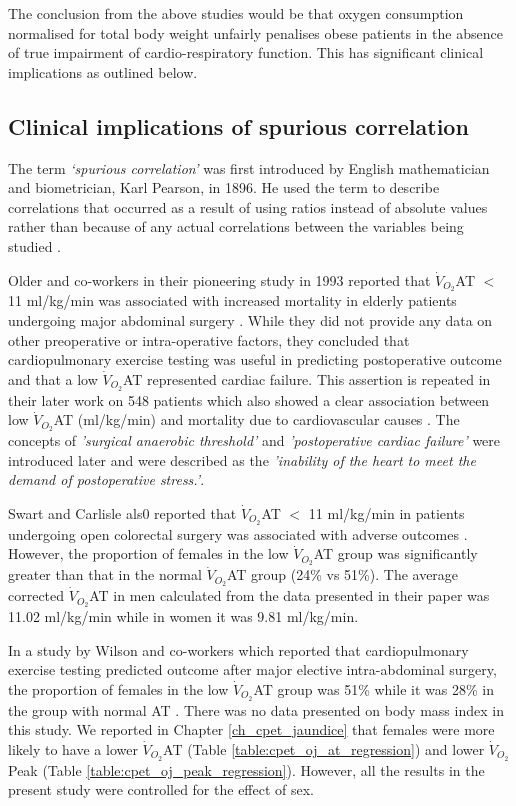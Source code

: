 The conclusion from the above studies would be that oxygen consumption normalised for total body weight unfairly penalises obese patients in the absence of true impairment of cardio-respiratory function. 
This has significant clinical implications as outlined below.

\subsection{Clinical implications of spurious correlation}

The term \textit{`spurious correlation'} was first introduced by English mathematician and biometrician, Karl Pearson, in 1896. 
He used the term to describe correlations that occurred as a result of using ratios instead of absolute values rather than because of any actual correlations between the variables being studied \parencite{pearson_mathematical_1896}.

Older and co-workers in their pioneering study in 1993 reported that $\dot{V}_{O_2}$AT $<$ 11 ml/kg/min was associated with increased mortality in elderly patients undergoing major abdominal surgery \parencite{older_preoperative_1993}. 
While they did not provide any data on other preoperative or intra-operative factors, they concluded that cardiopulmonary exercise testing was useful in predicting postoperative outcome and that a low $\dot{V}_{O_2}$AT represented cardiac failure. 
This assertion is repeated in their later work on 548 patients which also showed a clear association between low $\dot{V}_{O_2}$AT (ml/kg/min) and mortality due to cardiovascular causes \parencite{older_cardiopulmonary_1999}. 
The concepts of \textit{'surgical anaerobic threshold'} and \textit{'postoperative cardiac failure'} were introduced later and were described as the \textit{'inability of the heart to meet the demand of postoperative stress.'}\parencite{_ats/accp_2003}.

Swart and Carlisle als0 reported that $\dot{V}_{O_2}$AT $<$ 11 ml/kg/min in patients undergoing open colorectal surgery was associated with adverse outcomes \parencite{swart_case-controlled_2012}. 
However, the proportion of females in the low $\dot{V}_{O_2}$AT group was significantly greater than that in the normal $\dot{V}_{O_2}$AT group (24\% vs 51\%). 
The average corrected $\dot{V}_{O_2}$AT in men calculated from the data presented in their paper was 11.02 ml/kg/min while in women it was 9.81 ml/kg/min. 

In a study by Wilson and co-workers which reported that cardiopulmonary exercise testing predicted outcome after major elective intra-abdominal surgery, the proportion of females in the low $\dot{V}_{O_2}$AT group was 51\% while it was 28\% in the group with normal AT \parencite{wilson_impaired_2010}. 
There was no data presented on body mass index in this study. 
We reported in Chapter \ref{ch_cpet_jaundice} that females were more likely to have a lower $\dot{V}_{O_2}$AT (Table \ref{table:cpet_oj_at_regression}) and lower $\dot{V}_{O_2}$Peak (Table \ref{table:cpet_oj_peak_regression}). 
However, all the results in the present study were controlled for the effect of sex. 

